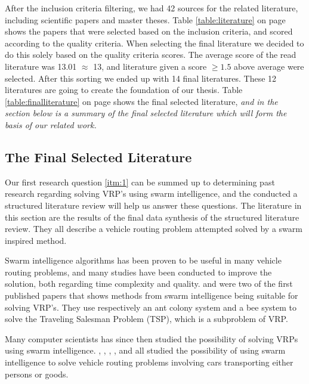 After the inclusion criteria filtering, we had 42 sources for the related literature, including scientific papers and master theses. Table \ref{table:literature} on page \pageref{table:literature} shows the papers that were selected based on the inclusion criteria, and scored according to the quality criteria. When selecting the final literature we decided to do this solely based on the quality criteria scores. The average score of the read literature was 13.01 $\approx$ 13, and literature given a score $\geq{1.5}$ above average were selected. After this sorting we ended up with 14 final literatures. These 12 literatures are going to create the foundation of our thesis. Table \ref{table:finalliterature} on page \pageref{table:finalliterature} shows the final selected literature, \emph{\color{red} and in the section below is a summary of the final selected literature which will form the basis of our related work.}


\subsection{The Final Selected Literature}
Our first research question \ref{itm:1} can be summed up to determining past research regarding solving VRP's using swarm intelligence, and the conducted a structured literature review will help us answer these questions. The literature in this section are the results of the final data synthesis of the structured literature review. They all describe a vehicle routing problem attempted solved by a swarm inspired method. 

Swarm intelligence algorithms has been proven to be useful in many vehicle routing problems, and many studies have been conducted to improve the solution, both regarding time complexity and quality. \citet{dorigo97} and \citet{lucic03} were two of the first published papers that shows methods from swarm intelligence being suitable for solving VRP's. They use respectively an ant colony system and a bee system to solve the Traveling Salesman Problem (TSP), which is a subproblem of VRP. 

Many computer scientists has since then studied the possibility of solving VRPs using swarm intelligence. \citet{hsiao04}, \citet{salehi-nezhad07}, \citet{tripathi09}, \citet{dias14}, and \citet{sedighpour14} all studied the possibility of using swarm intelligence to solve vehicle routing problems involving cars transporting either persons or goods. 

